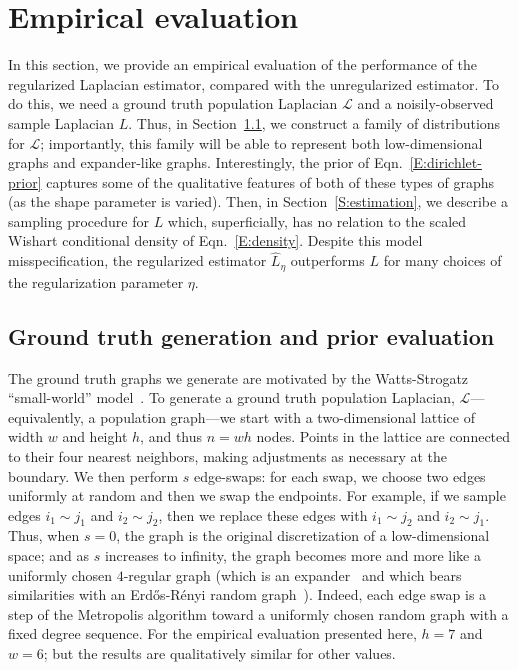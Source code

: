 \documentclass[12pt]{article}
\theoremstyle{plain}
\begin{document}
\section{Empirical evaluation}
\label{sxn:empirical}
\vspace{-1mm}

In this section, we provide an empirical evaluation of the performance of 
the regularized Laplacian estimator, compared with the unregularized 
estimator.  
To do this, we need a ground truth population Laplacian $\mathcal{L}$ and a 
noisily-observed sample Laplacian $L$. 
Thus, in Section~\ref{S:prior-evaluation}, we construct a family of 
distributions for $\mathcal{L}$; importantly, this family will be able to 
represent both low-dimensional graphs and expander-like graphs.  
Interestingly, the prior of Eqn.~\eqref{E:dirichlet-prior} captures some of 
the qualitative features of both of these types of graphs (as the shape 
parameter is varied).  
Then, in Section~\ref{S:estimation}, we describe a sampling procedure for 
$L$ which, superficially, has no relation to the scaled Wishart conditional 
density of Eqn.~\eqref{E:density}.  
Despite this model misspecification, the regularized estimator 
$\hat L_{\eta}$ outperforms $L$ for many choices of the regularization 
parameter $\eta$.  


\vspace{-2mm}
\subsection{Ground truth generation and prior evaluation}
\label{S:prior-evaluation}


The ground truth graphs we generate are motivated by the Watts-Strogatz 
``small-world'' model~\cite{watts98collective}.
To generate a ground truth population Laplacian, 
$\mathcal{L}$---equivalently, a population graph---we start with a 
two-dimensional lattice of width $w$ and height $h$, and thus $n = w h$ nodes.  
Points in the lattice are connected to their four nearest neighbors, making 
adjustments as necessary at the boundary.  
We then perform $s$ edge-swaps: for each swap, we choose two edges 
uniformly at random and then we swap the endpoints.  
For example, if we sample edges $i_1 \sim j_1$ and $i_2 \sim j_2$, then we
replace these edges with $i_1 \sim j_2$ and $i_2 \sim j_1$.  
Thus, when $s = 0$, the graph is the original discretization of a 
low-dimensional space; and as $s$ increases to infinity, the graph becomes 
more and more like a uniformly chosen $4$-regular graph (which is an 
expander~\cite{HLW06_expanders} and which bears similarities with an 
Erd\H{o}s-R\'{e}nyi random graph~\cite{Bollobas85}).
Indeed, each edge swap is a step of the Metropolis algorithm toward a 
uniformly chosen random graph with a fixed degree sequence.  
For the empirical evaluation presented here, $h = 7$ and $w = 6$; but the 
results are qualitatively similar for other values.
\end{document}
